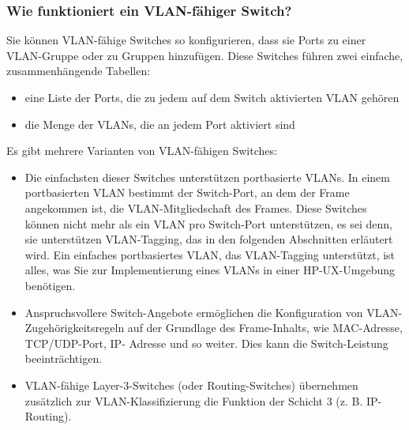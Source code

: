         \subsubsection{Wie funktioniert ein VLAN-fähiger Switch?}

        Sie können VLAN-fähige Switches so konfigurieren, dass sie Ports zu einer VLAN-Gruppe oder zu Gruppen hinzufügen. Diese Switches führen zwei einfache, zusammenhängende Tabellen:

        \begin{itemize}
            \item eine Liste der Ports, die zu jedem auf dem Switch aktivierten VLAN gehören
            \item die Menge der VLANs, die an jedem Port aktiviert sind
        \end{itemize}

        Es gibt mehrere Varianten von VLAN-fähigen Switches:

        \begin{itemize}
            \item Die einfachsten dieser Switches unterstützen portbasierte VLANs. In einem portbasierten VLAN bestimmt der Switch-Port, an dem der Frame angekommen ist, die VLAN-Mitgliedschaft des Frames. Diese Switches können nicht mehr als ein VLAN pro Switch-Port unterstützen, es sei denn, sie unterstützen VLAN-Tagging, das in den folgenden Abschnitten erläutert wird. Ein einfaches portbasiertes VLAN, das VLAN-Tagging unterstützt, ist alles, was Sie zur Implementierung eines VLANs in einer HP-UX-Umgebung benötigen.
            \item Anspruchsvollere Switch-Angebote ermöglichen die Konfiguration von VLAN- Zugehörigkeitsregeln auf der Grundlage des Frame-Inhalts, wie MAC-Adresse, TCP/UDP-Port, IP- Adresse und so weiter. Dies kann die Switch-Leistung beeinträchtigen.
            \item VLAN-fähige Layer-3-Switches (oder Routing-Switches) übernehmen zusätzlich zur VLAN-Klassifizierung die Funktion der Schicht 3 (z. B. IP-Routing).
        \end{itemize}

